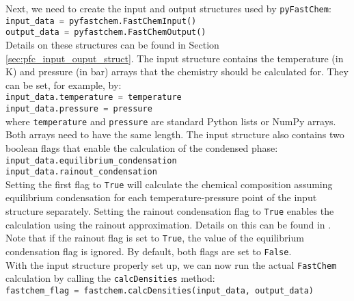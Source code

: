 \documentclass[numbers=noenddot]{aux/fcmanual}
\newcommand{\fc}{\texttt{FastChem}\xspace}
\newcommand{\pfc}{\texttt{pyFastChem}\xspace}
\begin{document}
Next, we need to create the input and output structures used by \pfc:\\

\lstinline[language=Python]!input_data = pyfastchem.FastChemInput()!\\
\lstinline[language=Python]!output_data = pyfastchem.FastChemOutput()!\\

Details on these structures can be found in Section \ref{sec:pfc_input_ouput_struct}. The input structure contains the temperature (in K) and pressure (in bar) arrays that the chemistry should be calculated for. They can be set, for example, by:\\

\lstinline[language=Python]!input_data.temperature = temperature!\\
\lstinline[language=Python]!input_data.pressure = pressure!\\

where \lstinline[language=Python]!temperature! and \lstinline[language=Python]!pressure! are standard Python lists or NumPy arrays. Both arrays need to have the same length. The input structure also contains two boolean flags that enable the calculation of the condensed phase:\\

\lstinline[language=Python]!input_data.equilibrium_condensation!\\
\lstinline[language=Python]!input_data.rainout_condensation!\\

Setting the first flag to \verb|True| will calculate the chemical composition assuming equilibrium condensation for each temperature-pressure point of the input structure separately. Setting the rainout condensation flag to \verb|True| enables the calculation using the rainout approximation. Details on this can be found in \citet{Kitzmann2023inprep}. Note that if the rainout flag is set to \verb|True|, the value of the equilibrium condensation flag is ignored. By default, both flags are set to \verb|False|.\\


With the input structure properly set up, we can now run the actual \fc calculation by calling the \lstinline[language=Python]!calcDensities! method:\\

\lstinline[language=Python]!fastchem_flag = fastchem.calcDensities(input_data, output_data)!\\
\end{document}
